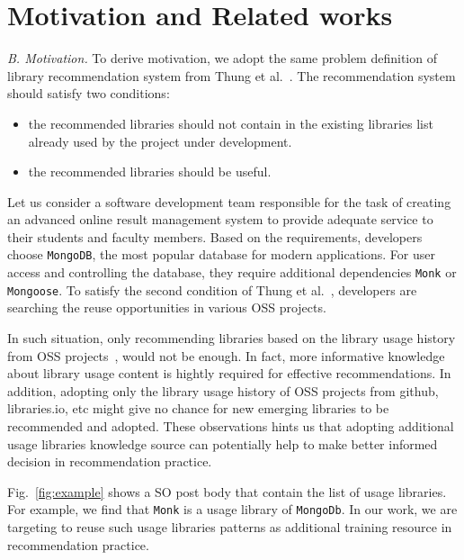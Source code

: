 \documentclass[paper]{ieice}
\begin{document}
\section{Motivation and Related works}
\label{sec:background}
\noindent\textit{B. Motivation. } To derive motivation, we adopt the same problem definition of library recommendation system from Thung et al.~\cite{thung2013automated}. The recommendation system should satisfy two conditions:
\begin{itemize}
    \item the recommended libraries should not contain in the existing libraries list already used by the project under development.
    \item the recommended libraries should be useful.
\end{itemize}
Let us consider a software development team responsible for the task of creating an advanced online result management system to provide adequate service to their students and faculty members. Based on the requirements, developers choose \texttt{MongoDB}, the most popular database for modern applications. For user access and controlling the database, they require additional dependencies \texttt{Monk} or \texttt{Mongoose}. To satisfy the second condition of Thung et al.~\cite{thung2013automated}, developers are searching the reuse opportunities in various OSS projects. 

In such situation, only recommending libraries based on the library usage history from OSS projects~\cite{thung2013automated, nguyen2020crossrec}, would not be enough. In fact, more informative knowledge about library usage content is hightly required for effective recommendations. In addition, adopting only the library usage history of OSS projects from github, libraries.io, etc might give no chance for new emerging libraries to be recommended and adopted. These observations hints us that adopting additional usage libraries knowledge source can potentially help to make better informed decision in recommendation practice. 

Fig.~\ref{fig:example} shows a SO post body that contain the list of usage libraries. For example, we find that \texttt{Monk} is a usage library of \texttt{MongoDb}. In our work, we are targeting to reuse such usage libraries patterns as additional training resource in recommendation practice.\\

\end{document}
